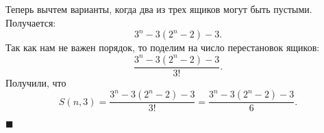 \documentclass{article}
\begin{document}
\begin{enumerate}
    Теперь вычтем варианты, когда два из трех ящиков могут быть пустыми. Получается:
    \begin{equation}
        3^n-3(2^n-2)-3.
    \end{equation}
    Так как нам не важен порядок, то поделим на число перестановок ящиков:
    \begin{equation}
        \frac{3^n-3(2^n-2)-3}{3!}.
    \end{equation}
    Получили, что
    \begin{equation}
        S(n,3)=\frac{3^n-3(2^n-2)-3}{3!} = \frac{3^n-3(2^n-2)-3}{6}.
    \end{equation}
    \begin{flushright}
        $\blacksquare$
    \end{flushright}
    
    
    
    \end{enumerate}
\end{document}
